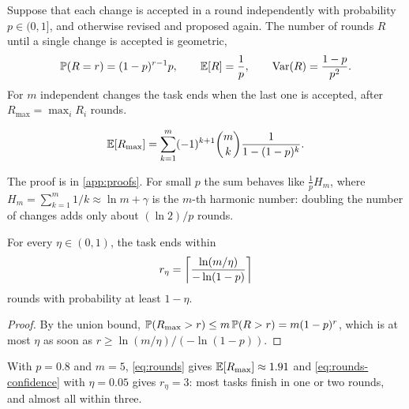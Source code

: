 Suppose that each change is accepted in a round independently with probability
$p \in (0,1]$, and otherwise revised and proposed again. The number of rounds
$R$ until a single change is accepted is geometric,
\begin{equation}
  \Prob(R = r) = (1-p)^{r-1} p, \qquad
  \E[R] = \frac{1}{p}, \qquad
  \Var(R) = \frac{1-p}{p^{2}} .
\end{equation}
For $m$ independent changes the task ends when the last one is accepted, after
$R_{\max} = \max_i R_i$ rounds.

\begin{proposition}
\label{prop:rounds}
\begin{equation}
  \E[R_{\max}]
  = \sum_{k=1}^{m} (-1)^{k+1} \binom{m}{k} \frac{1}{1 - (1-p)^{k}} .
  \label{eq:rounds}
\end{equation}
\end{proposition}

The proof is in \cref{app:proofs}. For small $p$ the sum behaves like
$\frac{1}{p} H_m$, where $H_m = \sum_{k=1}^{m} 1/k \approx \ln m + \gamma$ is
the $m$-th harmonic number: doubling the number of changes adds only about
$(\ln 2)/p$ rounds.

\begin{corollary}
\label{cor:rounds}
For every $\eta \in (0,1)$, the task ends within
\begin{equation}
  r_{\eta} = \ceil*{ \frac{\ln(m/\eta)}{-\ln(1-p)} }
  \label{eq:rounds-confidence}
\end{equation}
rounds with probability at least $1 - \eta$.
\end{corollary}

\begin{proof}
By the union bound, $\Prob(R_{\max} > r) \le m\, \Prob(R > r) = m (1-p)^{r}$,
which is at most $\eta$ as soon as $r \ge \ln(m/\eta) / (-\ln(1-p))$.
\end{proof}

\begin{example}
With $p = 0.8$ and $m = 5$, \cref{eq:rounds} gives
$\E[R_{\max}] \approx 1.91$ and \cref{eq:rounds-confidence} with $\eta = 0.05$
gives $r_{\eta} = 3$: most tasks finish in one or two rounds, and almost all
within three.
\end{example}
